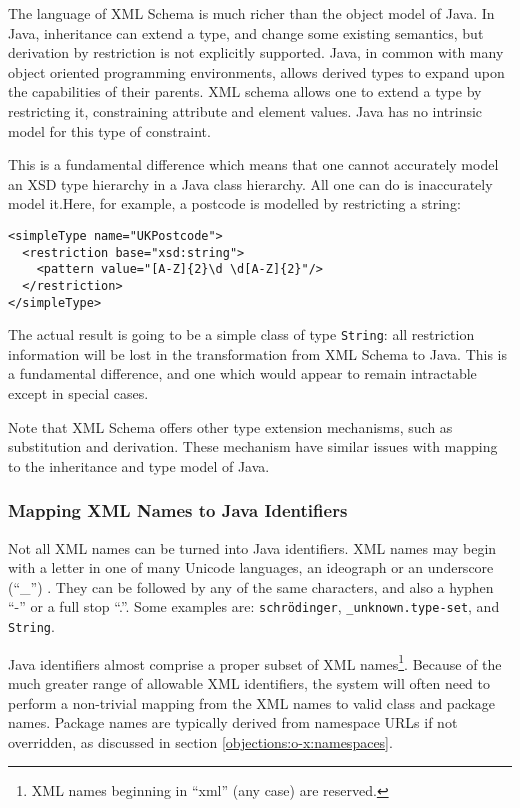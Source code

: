 The language of XML Schema is much richer than the object model of
Java. In Java, inheritance can extend a type, and change some existing
semantics, but derivation by restriction is not explicitly
supported. Java, in common with many object oriented programming
environments, allows derived types to expand upon the capabilities of
their parents. XML schema allows one to extend a type by restricting
it, constraining attribute and element values. Java has no intrinsic
model for this type of constraint.

This is a fundamental difference which means that one cannot
accurately model an XSD type hierarchy in a Java class hierarchy. All
one can do is inaccurately model it.Here, for example, a postcode is
modelled by restricting a string:


\begin{verbatim}
<simpleType name="UKPostcode">
  <restriction base="xsd:string">
    <pattern value="[A-Z]{2}\d \d[A-Z]{2}"/>
  </restriction>
</simpleType>
\end{verbatim}

The actual result is going to be a simple class of type {\tt String}:
all restriction information will be lost in the transformation from
XML Schema to Java. This is a fundamental difference, and one which
would appear to remain intractable except in special cases.

Note that XML Schema offers other type extension mechanisms, such as
substitution and derivation. These mechanism have similar issues with mapping
to the inheritance and type model of Java. 

\subsubsection{Mapping XML Names to Java Identifiers}
\label{objections:o-x:names}

Not all XML names can be turned into Java identifiers.  XML names may
begin with a letter in one of many Unicode languages, an ideograph or
an underscore (``\_'') . They can be followed by any of the same
characters, and also a hyphen ``-'' or a full stop ``.''. Some
examples are: {\tt schr\"odinger}, {\tt \_unknown.type-set}, and {\tt
String}.

Java identifiers almost comprise a proper subset of XML
names\footnote{XML names beginning in ``xml'' (any case) are reserved.}.
Because of the much greater range of allowable XML identifiers, the
system will often need to perform a non-trivial mapping from the XML
names to valid class and package names. Package names are typically
derived from namespace URLs if not overridden, as discussed in section
\ref{objections:o-x:namespaces}.

